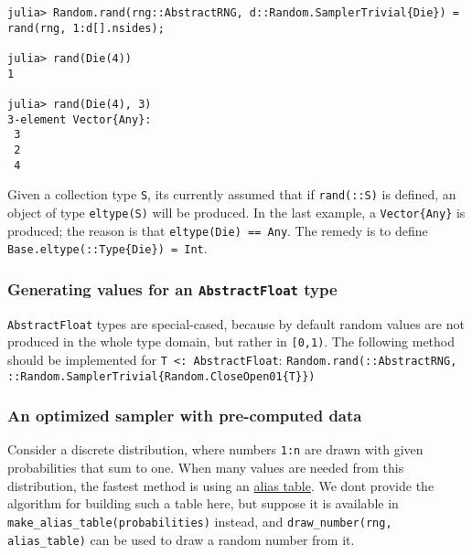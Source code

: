 \begin{verbatim}
julia> Random.rand(rng::AbstractRNG, d::Random.SamplerTrivial{Die}) = rand(rng, 1:d[].nsides);

julia> rand(Die(4))
1

julia> rand(Die(4), 3)
3-element Vector{Any}:
 3
 2
 4
\end{verbatim}



Given a collection type \texttt{S}, it{\textquotesingle}s currently assumed that if \texttt{rand(::S)} is defined, an object of type \texttt{eltype(S)} will be produced. In the last example, a \texttt{Vector\{Any\}} is produced; the reason is that \texttt{eltype(Die) == Any}. The remedy is to define \texttt{Base.eltype(::Type\{Die\}) = Int}.



\hypertarget{1884287946239364410}{}


\subsubsection{Generating values for an \texttt{AbstractFloat} type}



\texttt{AbstractFloat} types are special-cased, because by default random values are not produced in the whole type domain, but rather in \texttt{[0,1)}. The following method should be implemented for \texttt{T <: AbstractFloat}: \texttt{Random.rand(::AbstractRNG, ::Random.SamplerTrivial\{Random.CloseOpen01\{T\}\})}



\hypertarget{11354689514356683227}{}


\subsubsection{An optimized sampler with pre-computed data}



Consider a discrete distribution, where numbers \texttt{1:n} are drawn with given probabilities that sum to one. When many values are needed from this distribution, the fastest method is using an \href{https://en.wikipedia.org/wiki/Alias\_method}{alias table}. We don{\textquotesingle}t provide the algorithm for building such a table here, but suppose it is available in \texttt{make\_alias\_table(probabilities)} instead, and \texttt{draw\_number(rng, alias\_table)} can be used to draw a random number from it.



